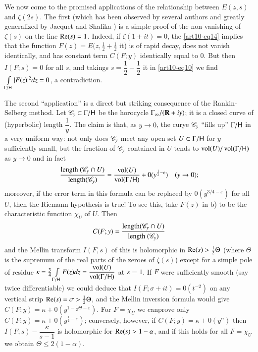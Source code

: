 We now come to the promised applications of the relationship between $E (z,s)$ and $\zeta(2s)$. The first (which has been observed by several authors and greatly generalized by Jacquet and Shalika \cite{art10-3}) is a simple proof of the non-vanishing of $\zeta(s)$ on the line $\operatorname{Re} (s) =1$. Indeed, if $\zeta (1+it) = 0$, the \eqref{art10-eq14} implies that the function $F(z) = E (z, \frac{1}{2} + \frac{1}{2}$ it) is of rapid decay, does not vanish identically, and has constant term $C(F;y)$ identically equal to 0. But then $I(F;s) =0$ for all $s$, and takings $s = \dfrac{1}{2} - \dfrac{1}{2}$ it in \eqref{art10-eq10} we find $\int\limits_{\Gamma / \mathsf{H}} |F(z)|^2 d z = 0$, a contradiction.

The second ``application'' is a direct but striking consequence of the Rankin-Selberg method. Let $\mathscr{C}_y \subset \Gamma / \mathsf{H}$ be the horocycle $\Gamma_\infty/ (\mathbf{R}+ iy)$; it is a closed curve of (hyperbolic) length $\dfrac{1}{y}$. The claim is that, as $y \to 0$, the curye $\mathscr{C}_y$ ``fills up'' $\Gamma / \mathsf{H}$ in a very uniform way: not only does $\mathscr{C}_y$ meet any open set $U \subset \Gamma / \mathsf{H}$ for $y$ sufficiently small, but the fraction of $\mathscr{C}_y$ contained in $U$ tends to $\operatorname{vol} (U)/ \operatorname{vol} (\Gamma / \mathsf{H})$ as $y \to 0$ and in fact
$$
\frac{\text{length }(\mathscr{C}_y \cap U)}{\text{length} (\mathscr{C}_y)} = \frac{\operatorname{vol} (U)}{\operatorname{vol} (\Gamma/ \mathsf{H})} + 0 (y^{\frac{1}{2} - \varepsilon}) \quad (y \to 0);
$$
moreover, if the error term in this formula can be replaced by $0(y^{3/4 - \varepsilon})$ for all $U$, then the Riemann hypothesis is true! To see this, take $F (z)$ in b) to be the characteristic function $\chi_U$ of $U$. Then 
$$
C (F; y) = \dfrac{\text{length} (\mathscr{C}_y \cap U)}{\text{length } (\mathscr{C}_y)}
$$ 
and the Mellin transform $I (F, s)$ of this is holomorphic in $\operatorname{Re} (s) > \frac{1}{2} \Theta$ (where $\Theta$ is the supremum of the real parts of the zeroes of $\zeta (s)$) except for a simple pole of residue $\kappa = \frac{3}{4} \int\limits_{\Gamma / \mathsf{H}} F (z) d z = \dfrac{\operatorname{vol} (U)}{\operatorname{vol} (\Gamma / \mathsf{H})}$ at $s =1$. If $F$ were sufficiently smooth (say twice differentiable) we could deduce that $I(F; \sigma + it) = 0 (t^{-2})$ on any vertical strip $\operatorname{Re}(s) = \sigma > \frac{1}{2} \Theta$, and the Mellin inversion formula would give $C (F; y) = \kappa + 0 (y^{1-\frac{1}{2} \Theta -\varepsilon})$. For $F = \chi_U$ we can\pageoriginale prove only $C (F; y) = \kappa + 0 (y^{\frac{1}{2} - \varepsilon})$; conversely, however, if $C (F; y) = \kappa + 0(y^\alpha)$ then $I (F; s) - \dfrac{\kappa}{s-1}$ is holomorphic for $\operatorname{Re}(s) >1-\alpha$, and if this holds for all $F = \chi_U$ we obtain $\Theta \leqslant 2 (1-\alpha)$.

